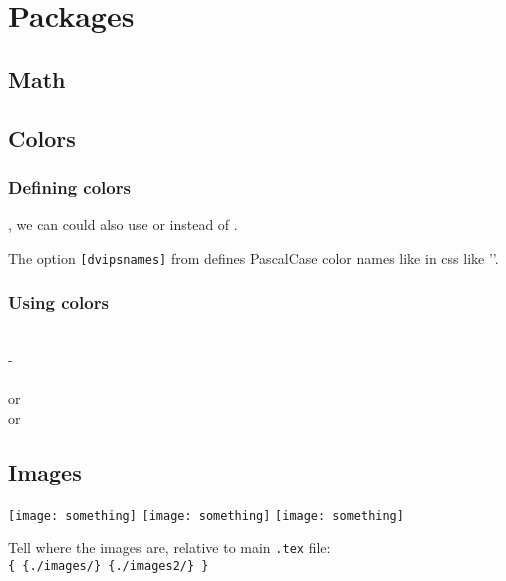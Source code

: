 \section{Packages}
\subsection{Math}
\begin{latex}
\usepackage{amsmath} %
\usepackage{mathtools} %
\usepackage{amssymb} %
\usepackage{amsfonts} %
\usepackage{mathrsfs} %
\end{latex}

\subsection{Colors}
\begin{latex}
\usepackage{color}
\usepackage[dvipsnames]{xcolor}
\end{latex}
\subsubsection* {Defining colors}
, we can could also use  or  instead of
.

The option \texttt{[dvipsnames]} from  defines PascalCase color names like in css like
''.

\subsubsection{Using colors}
\\
 - \\
\code{\pagecolor{White}}\\
or \\
or 

\subsection{Images}
\begin{latex}
\usepackage{graphicx}
\usepackage{epstopdf}%

\texttt{[image: something]}
\texttt{[image: something]}
\texttt{[image: something]}
\end{latex}
Tell where the images are, relative to main \texttt{.tex} file:\\
\code{\graphicspath}\texttt{\{ \{./images/\} \{./images2/\} \}}

